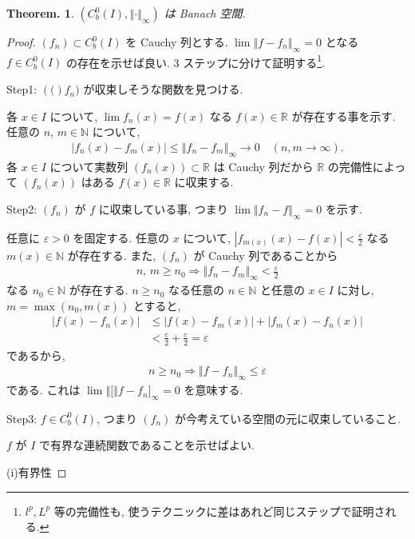 \documentclass[openany, a4paper, oneside]{jsbook}
\theoremstyle{break}
\theoremstyle{breakdefn}
\newtheorem{thm}{Theorem.}[section]
\newcommand{\abs}[1]{\left|#1\right|}
\newcommand{\norm}[1]{\left\Vert#1\right\Vert}
\newcommand{\rbk}[1]{\left (#1\right)}
\newcommand{\bbN}{\mathbb{N}}
\newcommand{\bbR}{\mathbb{R}}
\begin{document}
\begin{thm}
 $(C^0_b(I), \norm{\cdot}_{\infty})$ は Banach 空間.
\end{thm}
\begin{proof}
$\rbk{f_n} \subset C^0_b(I)$ を Cauchy 列とする.
$\lim \norm{f - f_n}_{\infty} = 0$ となる $f \in C^0_b(I)$ の存在を示せば良い.
3 ステップに分けて証明する\footnote{ $l^p, L^p$ 等の完備性も, 使うテクニックに差はあれど同じステップで証明される.}.

\textsf{Step1}: $\rbk(f_n)$ が収束しそうな関数を見つける.

各 $x \in I$ について, $\lim f_n(x)=f(x)$ なる $f(x) \in \bbR$ が存在する事を示す.
任意の $n$, $m \in \bbN$ について,
\begin{align*}
 \abs{f_n(x) - f_m(x)}
 \leq
 \norm{f_n - f_m}_{\infty} \to 0 \quad (n, m \to \infty).
\end{align*}
各 $x \in I$ について実数列 $\rbk{f_n(x)} \subset \bbR$ は Cauchy 列だから
$\bbR$ の完備性によって $\rbk{f_n(x)}$ はある $f(x) \in \bbR$ に収束する.

\textsf{Step2}: $\rbk{f_n}$ が $f$ に収束している事, つまり $\lim \norm{f_n - f}_{\infty} = 0$ を示す.

任意に $\varepsilon > 0$ を固定する.
任意の $x$ について, $\abs{f_{m(x)}(x)- f (x)} < \frac{\varepsilon}{2}$ なる $m(x) \in \bbN$ が存在する.
また, $\rbk{f_n}$ が Cauchy 列であることから
\begin{align*}
 n, \,  m
 \geq
 n_0
 \Rightarrow
 \norm{f_n - f_m}_{\infty}
 <
 \frac{\varepsilon}{2}
\end{align*}
なる $n_0 \in \bbN$ が存在する.
$n \geq n_0$ なる任意の $n \in \bbN$ と任意の $x \in I$ に対し,
$m = \max \rbk{n_0, m(x)}$ とすると,
\begin{align*}
 \abs{f(x) - f_n(x)}
 &\leq
 \abs{f(x) - f_m(x)} + \abs{f_m(x) - f_n(x)} \\
 &<
 \frac{\varepsilon}{2} + \frac{\varepsilon}{2}
 =
 \varepsilon
\end{align*}
であるから,
\begin{align*}
 n
 \geq
 n_0
 \Rightarrow
 \norm{f - f_n}_{\infty}
 \leq
 \varepsilon
\end{align*}
である.
これは $\lim \norm[f - f_n]_{\infty} = 0$ を意味する.

\textsf{Step3}: $f \in C^0_b(I)$, つまり $\rbk{f_n}$ が今考えている空間の元に収束していること.

$f$ が $I$ で有界な連続関数であることを示せばよい.

(i)有界性


\end{proof}
\end{document}

